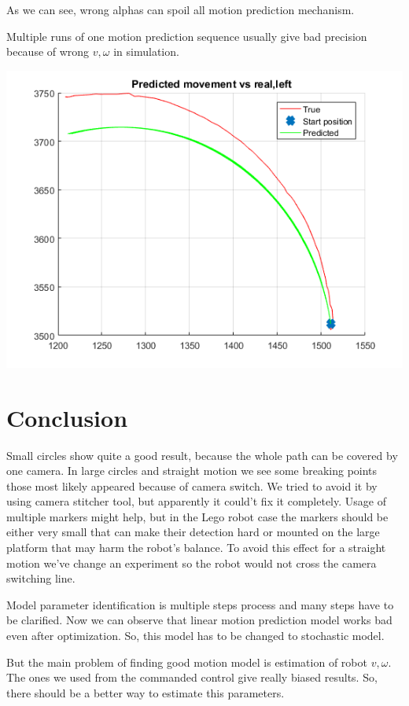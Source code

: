 \documentclass[a4paper, 12pt]{article}
\begin{document}
As we can see, wrong alphas can spoil all motion prediction mechanism.


Multiple runs of one motion prediction sequence usually give bad precision because of wrong $v,\omega$ in simulation.

\includegraphics[scale = 1]{scatter.png}

\section{Conclusion}

Small circles show quite a good result, because the whole path can be covered by one camera. In large circles and straight motion we see some breaking points those most likely appeared because of camera switch. We tried to avoid it by using camera stitcher tool, but apparently it could't fix it completely. Usage of multiple markers might help, but in the Lego robot case the markers should be either very small that can make their detection hard or mounted on the large platform that may harm the robot's balance. To avoid this effect for a straight motion we've change an experiment so the robot would not cross the camera switching line.

\bigskip

Model parameter identification is multiple steps process and many steps have to be clarified. Now we can observe that linear motion prediction model works bad even after optimization. So, this model has to be changed to stochastic model.

\bigskip

But the main problem of finding good motion model is estimation of robot $v,\omega$. The ones we used from the commanded control give really biased results. So, there should be a better way to estimate this parameters.
\end{document}
